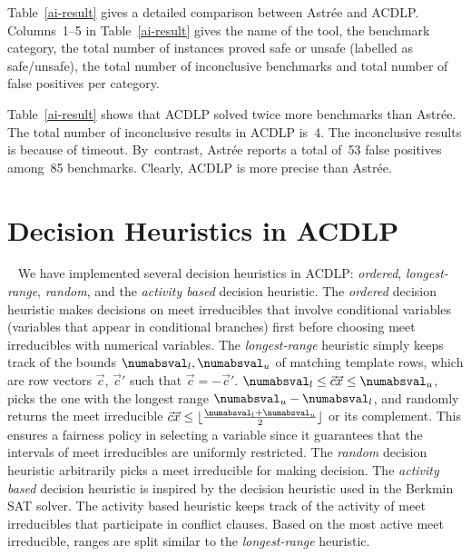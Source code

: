 Table~\ref{ai-result} gives a detailed comparison between Astr{\'e}e and
ACDLP.  Columns~1--5 in Table~\ref{ai-result} gives the name of the
tool, the benchmark category, the total number of instances proved safe or
unsafe (labelled as safe/unsafe), the total number of inconclusive
benchmarks and total number of false positives per category.

Table~\ref{ai-result} shows that ACDLP solved twice more benchmarks than
Astr{\'e}e.  The total number of inconclusive results in ACDLP is~4.  The
inconclusive results is because of timeout.  By~contrast, Astr{\'e}e reports
a total of~53 false positives among~85 benchmarks.  Clearly, ACDLP is more
precise than Astr{\'e}e.

\section{Decision Heuristics in ACDLP}~\label{decision}
%
We have implemented several decision heuristics in ACDLP: {\em ordered}, 
{\em longest-range}, {\em random}, and the {\em activity based} 
decision heuristic.  The {\em ordered} decision heuristic 
makes decisions on meet irreducibles that involve conditional 
variables (variables that appear in conditional branches) first 
before choosing meet irreducibles with numerical variables.  
%
The {\em longest-range} heuristic simply keeps track of the bounds
$\numabsval_l,\numabsval_u$ of matching template rows, which are 
row vectors $\vec{c}$, $\vec{c}'$ such that $\vec{c}=-\vec{c}'$.
$\numabsval_l\leq \vec{c}\vec{x}\leq \numabsval_u$, picks the one with the longest range
$\numabsval_u-\numabsval_l$, and randomly returns the meet irreducible
$\vec{c}\vec{x}\leq
\lfloor\frac{\numabsval_l+\numabsval_u}{2}\rfloor$ or its
complement. This ensures a fairness policy in selecting a variable
since it guarantees that the intervals of meet irreducibles are
uniformly restricted.
%
The {\em random} decision heuristic arbitrarily picks a meet irreducible  
for making decision. 
%
%
The {\em activity based} decision heuristic is inspired by the 
decision heuristic used in the Berkmin SAT solver.  
The activity based heuristic %
keeps track of the activity of meet irreducibles that 
participate in conflict clauses.  Based on the most 
active meet irreducible, ranges are split similar to 
the {\em longest-range} heuristic.
%

